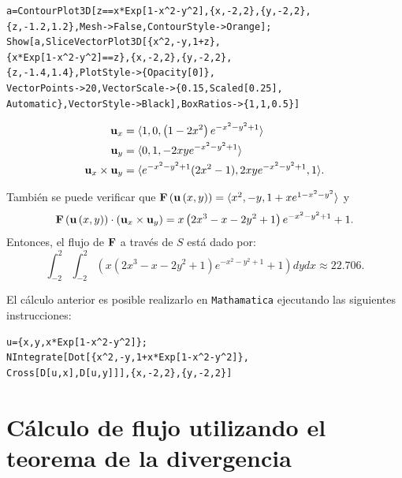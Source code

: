 \begin{tcolorbox}[title=\bf Instrucción \verb"Mathematica"]\begin{Verbatim}[formatcom=\letraverbatim]
a=ContourPlot3D[z==x*Exp[1-x^2-y^2],{x,-2,2},{y,-2,2},
{z,-1.2,1.2},Mesh->False,ContourStyle->Orange];
Show[a,SliceVectorPlot3D[{x^2,-y,1+z},
{x*Exp[1-x^2-y^2]==z},{x,-2,2},{y,-2,2},
{z,-1.4,1.4},PlotStyle->{Opacity[0]},
VectorPoints->20,VectorScale->{0.15,Scaled[0.25],
Automatic},VectorStyle->Black],BoxRatios->{1,1,0.5}]
\end{Verbatim}
\end{tcolorbox}

\enlargethispage*{\baselineskip}


\begin{align*}
{\bf u}_{x} &= \langle 1,0,\left( 1-2x^{2}\right) e^{-x^{2}-y^{2}+1}\rangle \\
{\bf u}_{y} &=  \langle 0,1,-2xye^{-x^{2}-y^{2}+1}\rangle \\
{\bf u}_{x}\times {\bf u}_{y} &= \langle e^{-x^{2}-y^{2}+1}(2x^{2}-1),2xye^{-x^{2}-y^{2}+1},1 \rangle.
\end{align*}

También se puede verificar que
${\bf F}\left({\bf u}\left( x,y\right) \right) =\langle x^{2},-y,1+xe^{1-x^{2}-y^{2}}\rangle$ y
\[{\bf F}\left({\bf u}\left( x,y\right) \right) \cdot \left({\bf u}_{x}\times {\bf u}_{y}\right)
= x\left( 2x^{3}-x-2y^{2}+1\right)e^{-x^{2}-y^{2}+1}+1.\]
Entonces, el flujo de ${\bf F}$ a través de $S$ está dado por:
\[\int_{-2}^{2}\int_{-2}^{2}\left( x\left( 2x^{3}-x-2y^{2}+1\right)e^{-x^{2}-y^{2}+1}+1\right) dydx \approx 22.706.\]

El cálculo anterior es posible realizarlo en \verb"Mathamatica" ejecutando las siguientes instrucciones:

\begin{tcolorbox}[title=\bf Instrucción \verb"Mathematica"]\begin{Verbatim}[formatcom=\letraverbatim]
u={x,y,x*Exp[1-x^2-y^2]};
NIntegrate[Dot[{x^2,-y,1+x*Exp[1-x^2-y^2]},
Cross[D[u,x],D[u,y]]],{x,-2,2},{y,-2,2}]
\end{Verbatim}
\end{tcolorbox}

\section{Cálculo de flujo utilizando el teorema de la divergencia}

